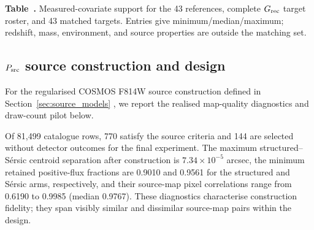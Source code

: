 \medskip
\noindent\begin{minipage}{\columnwidth}
\label{tab:gmatch_coverage}
\noindent\textbf{Table~\thetable.} Measured-covariate support for the 43
references, complete
\(G_{\rm rec}\) target roster, and 43 matched targets. Entries give
minimum/median/maximum; redshift, mass, environment, and source properties are
outside the matching set.
\begin{center}
\scriptsize
{}
\end{center}
\end{minipage}

\subsection{\(P_{\rm src}\) source construction and design}

For the regularised COSMOS F814W source construction defined in
Section~\ref{sec:source_models} \citep{Mandelbaum2012}, we report the realised
map-quality diagnostics and draw-count pilot below.

Of 81,499 catalogue rows, 770 satisfy the source criteria and 144 are
selected without detector outcomes for the final experiment. The maximum
structured--S\'{e}rsic centroid separation after construction is
\(7.34\times10^{-5}\) arcsec, the minimum retained positive-flux fractions
are 0.9010 and 0.9561 for the structured and S\'{e}rsic arms, respectively,
and their source-map pixel correlations range from 0.6190 to 0.9985
(median 0.9767). These diagnostics characterise construction fidelity; they
span visibly similar and dissimilar source-map pairs within the design.

